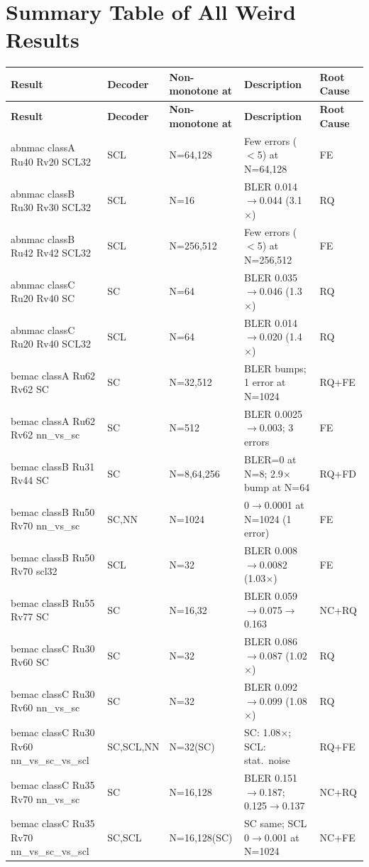 \documentclass[11pt,a4paper]{article}
\begin{document}
\section{Summary Table of All Weird Results}

\begin{landscape}
\begin{longtable}{p{5.5cm}llp{7cm}l}
\toprule
\textbf{Result} & \textbf{Decoder} & \textbf{Non-monotone at} & \textbf{Description} & \textbf{Root Cause} \\
\midrule
\endfirsthead
\toprule
\textbf{Result} & \textbf{Decoder} & \textbf{Non-monotone at} & \textbf{Description} & \textbf{Root Cause} \\
\midrule
\endhead

abnmac classA Ru40 Rv20 SCL32 & SCL & N=64,128 & Few errors ($<$5) at N=64,128 & FE \\
abnmac classB Ru30 Rv30 SCL32 & SCL & N=16 & BLER 0.014$\to$0.044 (3.1$\times$) & RQ \\
abnmac classB Ru42 Rv42 SCL32 & SCL & N=256,512 & Few errors ($<$5) at N=256,512 & FE \\
abnmac classC Ru20 Rv40 SC & SC & N=64 & BLER 0.035$\to$0.046 (1.3$\times$) & RQ \\
abnmac classC Ru20 Rv40 SCL32 & SCL & N=64 & BLER 0.014$\to$0.020 (1.4$\times$) & RQ \\
\midrule

bemac classA Ru62 Rv62 SC & SC & N=32,512 & BLER bumps; 1 error at N=1024 & RQ+FE \\
bemac classA Ru62 Rv62 nn\_vs\_sc & SC & N=512 & BLER 0.0025$\to$0.003; 3 errors & FE \\
bemac classB Ru31 Rv44 SC & SC & N=8,64,256 & BLER=0 at N=8; 2.9$\times$ bump at N=64 & RQ+FD \\
bemac classB Ru50 Rv70 nn\_vs\_sc & SC,NN & N=1024 & 0$\to$0.0001 at N=1024 (1 error) & FE \\
bemac classB Ru50 Rv70 scl32 & SCL & N=32 & BLER 0.008$\to$0.0082 (1.03$\times$) & FE \\
bemac classB Ru55 Rv77 SC & SC & N=16,32 & BLER 0.059$\to$0.075$\to$0.163 & NC+RQ \\
bemac classC Ru30 Rv60 SC & SC & N=32 & BLER 0.086$\to$0.087 (1.02$\times$) & RQ \\
bemac classC Ru30 Rv60 nn\_vs\_sc & SC & N=32 & BLER 0.092$\to$0.099 (1.08$\times$) & RQ \\
bemac classC Ru30 Rv60 nn\_vs\_sc\_vs\_scl & SC,SCL,NN & N=32(SC) & SC: 1.08$\times$; SCL: stat.\ noise & RQ+FE \\
bemac classC Ru35 Rv70 nn\_vs\_sc & SC & N=16,128 & BLER 0.151$\to$0.187; 0.125$\to$0.137 & NC+RQ \\
bemac classC Ru35 Rv70 nn\_vs\_sc\_vs\_scl & SC,SCL & N=16,128(SC) & SC same; SCL 0$\to$0.001 at N=1024 & NC+FE \\
\midrule


\end{longtable}
\end{landscape}
\end{document}
